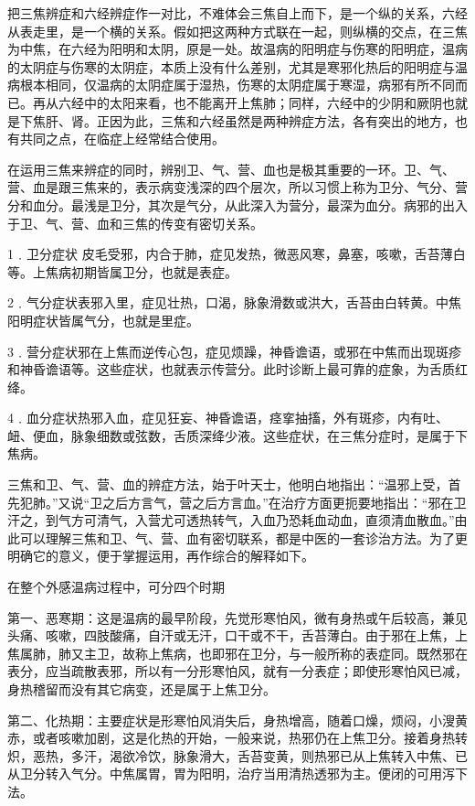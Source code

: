 \documentclass[a4paper,12pt,UTF8,twoside]{ctexbook}
\begin{document}
把三焦辨症和六经辨症作一对比，不难体会三焦自上而下，是一个纵的关系，六经从表走里，是一个横的关系。假如把这两种方式联在一起，则纵横的交点，在三焦为中焦，在六经为阳明和太阴，原是一处。故温病的阳明症与伤寒的阳明症，温病的太阴症与伤寒的太阴症，本质上没有什么差别，尤其是寒邪化热后的阳明症与温病根本相同，仅温病的太阴症属于湿热，伤寒的太阴症属于寒湿，病邪有所不同而已。再从六经中的太阳来看，也不能离开上焦肺；同样，六经中的少阴和厥阴也就是下焦肝、肾。正因为此，三焦和六经虽然是两种辨症方法，各有突出的地方，也有共同之点，在临症上经常结合使用。

在运用三焦来辨症的同时，辨别卫、气、营、血也是极其重要的一环。卫、气、营、血是跟三焦来的，表示病变浅深的四个层次，所以习惯上称为卫分、气分、营分和血分。最浅是卫分，其次是气分，从此深入为营分，最深为血分。病邪的出入于卫、气、营、血和三焦的传变有密切关系。

1﹒卫分症状 皮毛受邪，内合于肺，症见发热，微恶风寒，鼻塞，咳嗽，舌苔薄白等。上焦病初期皆属卫分，也就是表症。

2﹒气分症状表邪入里，症见壮热，口渴，脉象滑数或洪大，舌苔由白转黄。中焦阳明症状皆属气分，也就是里症。

3﹒营分症状邪在上焦而逆传心包，症见烦躁，神昏谵语，或邪在中焦而出现斑疹和神昏谵语等。这些症状，也就表示传营分。此时诊断上最可靠的症象，为舌质红绛。

4﹒血分症状热邪入血，症见狂妄、神昏谵语，痉挛抽搐，外有斑疹，内有吐、衄、便血，脉象细数或弦数，舌质深绛少液。这些症状，在三焦分症时，是属于下焦病。

三焦和卫、气、营、血的辨症方法，始于叶天士，他明白地指出：“温邪上受，首先犯肺。”又说“卫之后方言气，营之后方言血。”在治疗方面更扼要地指出：“邪在卫汗之，到气方可清气，入营尤可透热转气，入血乃恐耗血动血，直须清血散血。”由此可以理解三焦和卫、气、营、血有密切联系，都是中医的一套诊治方法。为了更明确它的意义，便于掌握运用，再作综合的解释如下。

在整个外感温病过程中，可分四个时期

第一、恶寒期：这是温病的最早阶段，先觉形寒怕风，微有身热或午后较高，兼见头痛、咳嗽，四肢酸痛，自汗或无汗，口干或不干，舌苔薄白。由于邪在上焦，上焦属肺，肺又主卫，故称上焦病，也即邪在卫分，与一般所称的表症同。既然邪在表分，应当疏散表邪，所以有一分形寒怕风，就有一分表症；即使形寒怕风已减，身热稽留而没有其它病变，还是属于上焦卫分。

第二、化热期：主要症状是形寒怕风消失后，身热增高，随着口燥，烦闷，小溲黄赤，或者咳嗽加剧，这是化热的开始，一般来说，热邪仍在上焦卫分。接着身热转炽，恶热，多汗，渴欲冷饮，脉象滑大，舌苔变黄，则热邪已从上焦转入中焦、已从卫分转入气分。中焦属胃，胃为阳明，治疗当用清热透邪为主。便闭的可用泻下法。
\end{document}
